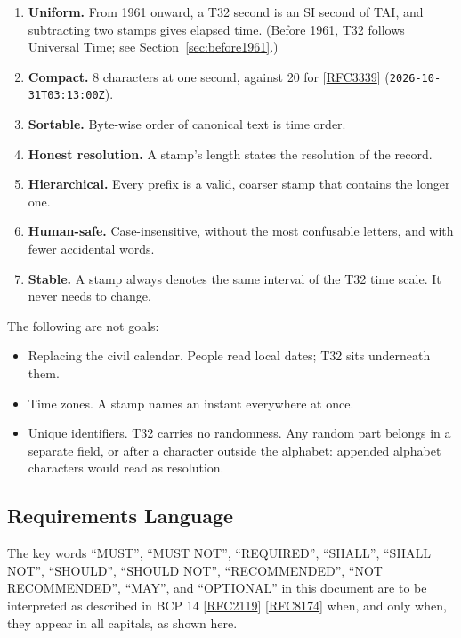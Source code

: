 \documentclass[11pt]{article}
\newcommand{\lit}[1]{\texttt{#1}}
\newcommand{\Sec}[1]{Section~\ref{#1}}
\newcommand{\xref}[1]{[\hyperref[ref:#1]{#1}]}
\begin{document}
\begin{enumerate}
\item \textbf{Uniform.} From 1961 onward, a T32 second is an SI second of TAI,
and subtracting two stamps gives elapsed time. (Before 1961, T32 follows
Universal Time; see \Sec{sec:before1961}.)
\item \textbf{Compact.} 8 characters at one second, against 20 for
\xref{RFC3339} (\lit{2026-10-31T03:13:00Z}).
\item \textbf{Sortable.} Byte-wise order of canonical text is time order.
\item \textbf{Honest resolution.} A stamp's length states the resolution of
the record.
\item \textbf{Hierarchical.} Every prefix is a valid, coarser stamp that
contains the longer one.
\item \textbf{Human-safe.} Case-insensitive, without the most confusable
letters, and with fewer accidental words.
\item \textbf{Stable.} A stamp always denotes the same interval of the T32
time scale. It never needs to change.
\end{enumerate}

The following are not goals:

\begin{itemize}
\item Replacing the civil calendar. People read local dates; T32 sits
underneath them.
\item Time zones. A stamp names an instant everywhere at once.
\item Unique identifiers. T32 carries no randomness. Any random part belongs
in a separate field, or after a character outside the alphabet: appended
alphabet characters would read as resolution.
\end{itemize}

\subsection{Requirements Language}

{\sloppy The key words ``MUST'', ``MUST NOT'', ``REQUIRED'', ``SHALL'', ``SHALL NOT'',
``SHOULD'', ``SHOULD NOT'', ``RECOMMENDED'', ``NOT RECOMMENDED'', ``MAY'', and
``OPTIONAL'' in this document are to be interpreted as described in
BCP 14 \xref{RFC2119} \xref{RFC8174} when, and only when, they appear in all
capitals, as shown here.\par}
\end{document}
